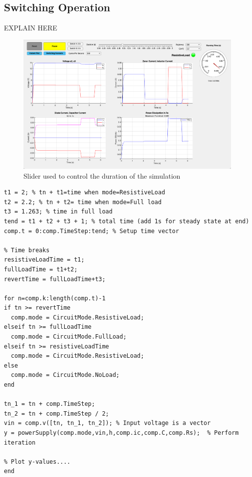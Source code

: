 \pagebreak
\subsection{Switching Operation}
EXPLAIN HERE
\begin{figure}[H]
    \centering
   	\includegraphics[width=\textwidth]{graphics/visualisation/switching_4}
	\caption{Slider used to control the duration of the simulation}
\end{figure}

\begin{lstlisting}[caption=Extract of code used to perform switching operation]
t1 = 2; % tn + t1=time when mode=ResistiveLoad
t2 = 2.2; % tn + t2= time when mode=Full load
t3 = 1.263; % time in full load
tend = t1 + t2 + t3 + 1; % total time (add 1s for steady state at end)
comp.t = 0:comp.TimeStep:tend; % Setup time vector

% Time breaks
resistiveLoadTime = t1;
fullLoadTime = t1+t2;
revertTime = fullLoadTime+t3;

for n=comp.k:length(comp.t)-1
if tn >= revertTime
  comp.mode = CircuitMode.ResistiveLoad;
elseif tn >= fullLoadTime
  comp.mode = CircuitMode.FullLoad;
elseif tn >= resistiveLoadTime
  comp.mode = CircuitMode.ResistiveLoad;
else
  comp.mode = CircuitMode.NoLoad;
end
	
tn_1 = tn + comp.TimeStep;
tn_2 = tn + comp.TimeStep / 2;
vin = comp.v([tn, tn_1, tn_2]); % Input voltage is a vector
y = powerSupply(comp.mode,vin,h,comp.ic,comp.C,comp.Rs);  % Perform iteration
    
% Plot y-values....
end
\end{lstlisting}
